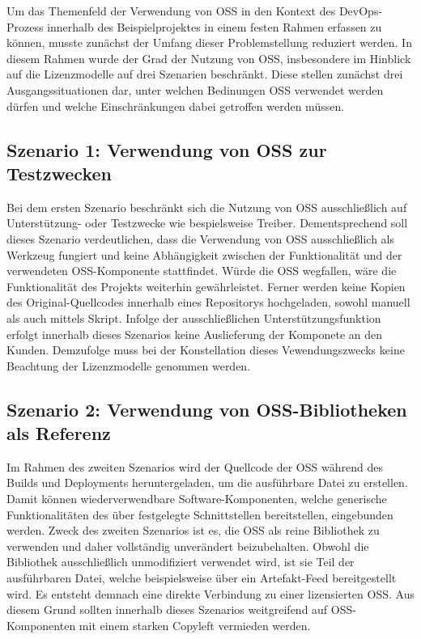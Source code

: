 Um das Themenfeld der Verwendung von OSS in den Kontext des DevOps-Prozess innerhalb des Beispielprojektes in einem festen Rahmen erfassen zu können, musste zunächst der Umfang dieser Problemstellung reduziert werden. In diesem Rahmen wurde der Grad der Nutzung von OSS, insbesondere im Hinblick auf die Lizenzmodelle auf drei Szenarien beschränkt. Diese stellen zunächst drei Ausgangssituationen dar, unter welchen Bedinungen OSS verwendet werden dürfen und welche Einschränkungen dabei getroffen werden müssen.   

\subsection{Szenario 1: Verwendung von OSS zur Testzwecken}

Bei dem ersten Szenario beschränkt sich die Nutzung von OSS ausschließlich auf Unterstützung- oder Testzwecke wie bespielsweise Treiber. Dementsprechend soll dieses Szenario verdeutlichen, dass die Verwendung von OSS ausschließlich als Werkzeug fungiert und keine Abhängigkeit zwischen der Funktionalität und der verwendeten OSS-Komponente stattfindet. Würde die OSS wegfallen, wäre die Funktionalität des Projekts weiterhin gewährleistet. Ferner werden keine Kopien des Original-Quellcodes innerhalb eines Repositorys hochgeladen, sowohl manuell als auch mittels Skript. Infolge der ausschließlichen Unterstützungsfunktion erfolgt innerhalb dieses Szenarios keine Auslieferung der Komponete an den Kunden. Demzufolge muss bei der Konstellation dieses Vewendungszwecks keine Beachtung der Lizenzmodelle genommen werden. 

\subsection{Szenario 2: Verwendung von OSS-Bibliotheken als Referenz}

Im Rahmen des zweiten Szenarios wird der Quellcode der OSS während des Builds und Deployments heruntergeladen, um die ausführbare Datei zu erstellen. Damit können wiederverwendbare Software-Komponenten, welche generische Funktionalitäten des über festgelegte Schnittstellen bereitstellen, eingebunden werden. Zweck des zweiten Szenarios ist es, die OSS als reine Bibliothek zu verwenden und daher vollständig unverändert beizubehalten. Obwohl die Bibliothek ausschließlich unmodifiziert verwendet wird, ist sie Teil der ausführbaren Datei, welche beispielsweise über ein Artefakt-Feed bereitgestellt wird. Es entsteht demnach eine direkte Verbindung zu einer lizensierten OSS. Aus diesem Grund sollten innerhalb dieses Szenarios weitgreifend auf OSS-Komponenten mit einem starken Copyleft vermieden werden. 

